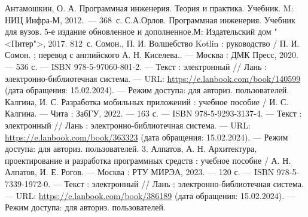 \begin{thebibliography}{99\kern\bibindent}
    \bibitem{} Антамошкин, О. А. Программная инженерия. Теория и практика.
    Учебник. M: НИЦ Инфра-М, 2012.~--- 368~с.
    \bibitem{} С.А.Орлов. Программная инженерия.
    Учебник для вузов. 5-е издание обновленное и дополненное.М:
    Издательский дом "<Питер">, 2017. 812~с.
    \bibitem{} Сомон., П. И. Волшебство Kotlin : руководство / П. И. Сомон. ;
    перевод с английского А. Н. Киселева.. — Москва :
    ДМК Пресс, 2020. — 536 с. — ISBN 978-5-97060-801-2. — Текст :
    электронный // Лань : электронно-библиотечная система. — URL:
    \url{https://e.lanbook.com/book/140599} (дата обращения: 15.02.2024).
    — Режим доступа: для авториз. пользователей.
    \bibitem{} Калгина, И. С. Разработка мобильных приложений :
    учебное пособие / И. С. Калгина. — Чита : ЗабГУ, 2022. — 163 с.
    — ISBN 978-5-9293-3137-4. — Текст : электронный // Лань :
    электронно-библиотечная система.
    — URL: \url{https://e.lanbook.com/book/363323}
    (дата обращения: 15.02.2024). — Режим доступа:
    для авториз. пользователей.
    \bibitem{} 3. Алпатов, А. Н. Архитектура, проектирование
    и разработка программных средств :
    учебное пособие / А. Н. Алпатов, И. Е. Рогов. — Москва :
    РТУ МИРЭА, 2023. — 120 с. — ISBN 978-5-7339-1972-0. — Текст :
    электронный // Лань : электронно-библиотечная система.
    — URL: \url{https://e.lanbook.com/book/386189}
    (дата обращения: 15.02.2024). — Режим доступа: для авториз.
    пользователей.
\end{thebibliography}
